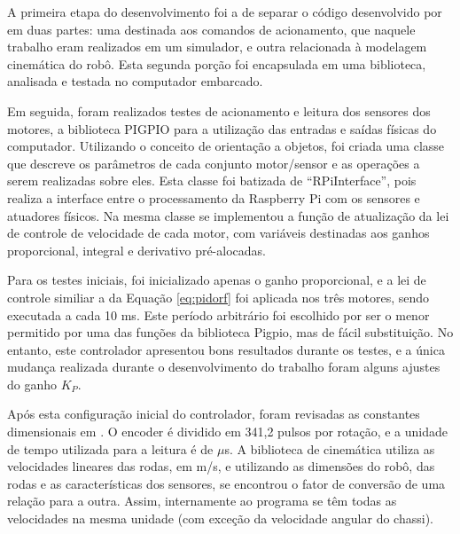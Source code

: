 
A primeira etapa do desenvolvimento foi a de separar o código desenvolvido por \citet{ritter2016modelagem} em duas partes: uma destinada aos comandos de acionamento, que naquele trabalho eram realizados em um simulador, e outra relacionada à modelagem cinemática do robô. Esta segunda porção foi encapsulada em uma biblioteca, analisada e testada no computador embarcado.

Em seguida, foram realizados testes de acionamento e leitura dos sensores dos motores, a biblioteca PIGPIO \citep{pigpio} para a utilização das entradas e saídas físicas do computador. Utilizando o conceito de orientação a objetos, foi criada uma classe que descreve os parâmetros de cada conjunto motor/sensor e as operações a serem realizadas sobre eles. Esta classe foi batizada de ``RPiInterface'', pois realiza a interface entre o processamento da Raspberry Pi com os sensores e atuadores físicos.
Na mesma classe se implementou a função de atualização da lei de controle de velocidade de cada motor, com variáveis destinadas aos ganhos proporcional, integral e derivativo pré-alocadas.

Para os testes iniciais, foi inicializado apenas o ganho proporcional, e a lei de controle similiar a da Equação \ref{eq:pidorf} foi aplicada nos três motores, sendo executada a cada 10 ms. Este período arbitrário foi escolhido por ser o menor permitido por uma das funções da biblioteca Pigpio, mas de fácil substituição. No entanto, este controlador apresentou bons resultados durante os testes, e a única mudança realizada durante o desenvolvimento do trabalho foram alguns ajustes do ganho $K_P$.

Após esta configuração inicial do controlador, foram revisadas as constantes dimensionais em \cite{ritter2016modelagem}. O encoder é dividido em 341,2 pulsos por rotação, e a unidade de tempo utilizada para a leitura é de $\mu$s. A biblioteca de cinemática utiliza as velocidades lineares das rodas, em m/s, e utilizando as dimensões do robô, das rodas e as características dos sensores, se encontrou o fator de conversão de uma relação para a outra. Assim, internamente ao programa se têm todas as velocidades na mesma unidade (com exceção da velocidade angular do chassi).

